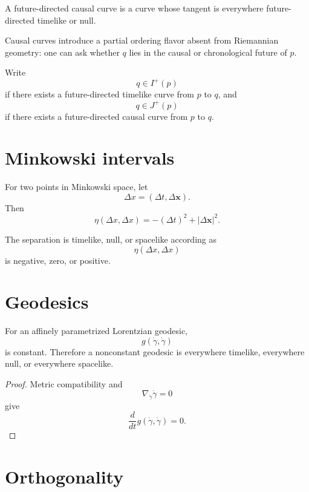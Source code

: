 \begin{definition}\label{def:vii30-causal-curve}
A future-directed causal curve is a curve whose tangent is everywhere
future-directed timelike or null.
\end{definition}

Causal curves introduce a partial ordering flavor absent from Riemannian geometry:
one can ask whether \(q\) lies in the causal or chronological future of \(p\).

\begin{definition}\label{def:vii30-futures}
Write
\[
q\in I^+(p)
\]
if there exists a future-directed timelike curve from \(p\) to \(q\), and
\[
q\in J^+(p)
\]
if there exists a future-directed causal curve from \(p\) to \(q\).
\end{definition}

\section{Minkowski intervals}

For two points in Minkowski space, let
\[
\Delta x=(\Delta t,\Delta\mathbf x).
\]
Then
\[
\eta(\Delta x,\Delta x)
=
-(\Delta t)^2+|\Delta\mathbf x|^2.
\]

\begin{proposition}\label{prop:vii30-interval}
The separation is timelike, null, or spacelike according as
\[
\eta(\Delta x,\Delta x)
\]
is negative, zero, or positive.
\end{proposition}

\section{Geodesics}

\begin{proposition}\label{prop:vii30-geodesic-type}
For an affinely parametrized Lorentzian geodesic,
\[
g(\dot\gamma,\dot\gamma)
\]
is constant.
Therefore a nonconstant geodesic is everywhere timelike, everywhere null, or
everywhere spacelike.
\end{proposition}

\begin{proof}
Metric compatibility and
\[
\nabla_{\dot\gamma}\dot\gamma=0
\]
give
\[
\frac d{dt}g(\dot\gamma,\dot\gamma)=0.
\]
\end{proof}

\section{Orthogonality}

